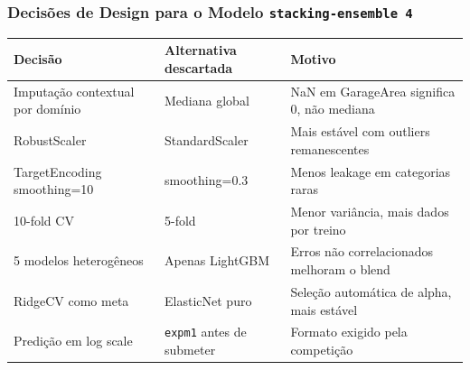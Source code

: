 \documentclass[11pt]{article}
\begin{document}
\subsubsection{Decisões de Design para o Modelo \texttt{stacking-ensemble 4}}
\label{sec:org109fed3}
\begin{center}
\begin{tabular}{lll}
Decisão & Alternativa descartada & Motivo\\
\hline
Imputação contextual por domínio & Mediana global & NaN em GarageArea significa 0, não mediana\\
RobustScaler & StandardScaler & Mais estável com outliers remanescentes\\
TargetEncoding smoothing=10 & smoothing=0.3 & Menos leakage em categorias raras\\
10-fold CV & 5-fold & Menor variância, mais dados por treino\\
5 modelos heterogêneos & Apenas LightGBM & Erros não correlacionados melhoram o blend\\
RidgeCV como meta & ElasticNet puro & Seleção automática de alpha, mais estável\\
Predição em log scale & \texttt{expm1} antes de submeter & Formato exigido pela competição\\
\end{tabular}
\end{center}
\end{document}
